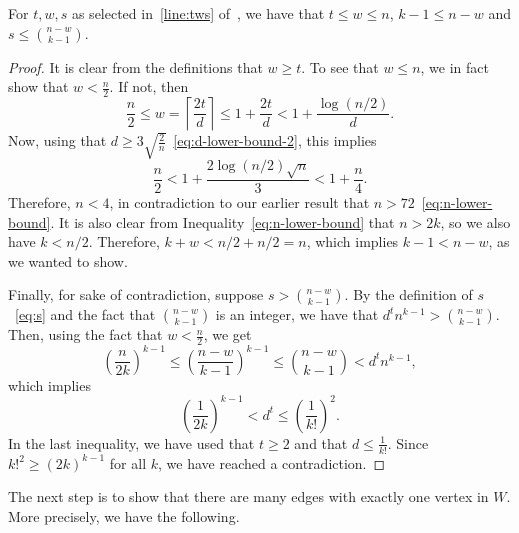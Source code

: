 \begin{lemma}\label{lm:sound}
    For $t, w, s$ as selected in~\cref{line:tws} of~,
    we have that
    $t  \leq w \leq n$, $k - 1 \leq n - w$ and $s \leq \binom{n - w}{k - 1}$.
    \begin{proof}
        It is clear from the definitions that $w \geq t$.
        To see that $w \leq n$, we in fact show that $w < \frac{n}{2}$.
        If not, then
        \[
            \frac{n}{2} \leq
            w =
            \left\lceil \frac{2t}{d} \right\rceil \leq
            1 + \frac{2t}{d} <
            1 + \frac{\log (n/2)}{d}.
        \]
        Now, using that $d \geq 3 \sqrt{\frac{2}{n}}$~\eqref{eq:d-lower-bound-2},
        this implies
        \[
            \frac{n}{2} <
            1 + \frac{2 \log (n/2) \sqrt{n}}{3} <
            1 + \frac{n}{4}.
        \]
        Therefore, $n < 4$, in contradiction to our earlier result that $n > 72$~\eqref{eq:n-lower-bound}.
        It is also clear from Inequality~\eqref{eq:n-lower-bound} that $n > 2k$,
        so we also have $k < n/2$.
        Therefore, $ k + w < n/2 + n/2 = n$, which implies $k - 1 < n - w$,
        as we wanted to show.

        Finally, for sake of contradiction,
        suppose $s > \binom{n - w}{k - 1}$.
        By the definition of $s$~\eqref{eq:s}
        and the fact that $\binom{n-w}{k-1}$ is an integer, we have that
        $d^t n^{k-1} > \binom{n - w}{k - 1}$.
        Then, using the fact that $w < \frac{n}{2}$, we get
        \[
            \left( \frac{n}{2k} \right)^{k-1} \leq
            \left( \frac{n-w}{k-1} \right)^{k-1} \leq
            \binom{n - w}{k - 1} < d^t n^{k-1},
        \]
        which implies
        \[
            \left( \frac{1}{2k} \right)^{k-1} < d^t \leq
            \left( \frac{1}{k!} \right)^2.
        \]
        In the last inequality, we have used that $t \geq 2$ and that $d \leq \frac{1}{k!}$.
        Since $k!^2 \geq (2k)^{k-1}$ for all $k$,
        we have reached a contradiction. \qedhere

    \end{proof}
\end{lemma}

The next step is to show that there are many edges with exactly one vertex in $W$.
More precisely, we have the following.

